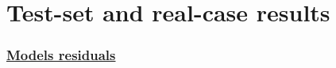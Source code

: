 



\section{Test-set and real-case results}
\label{sec:results}
\subsubsection*{\underline{Models residuals}}

